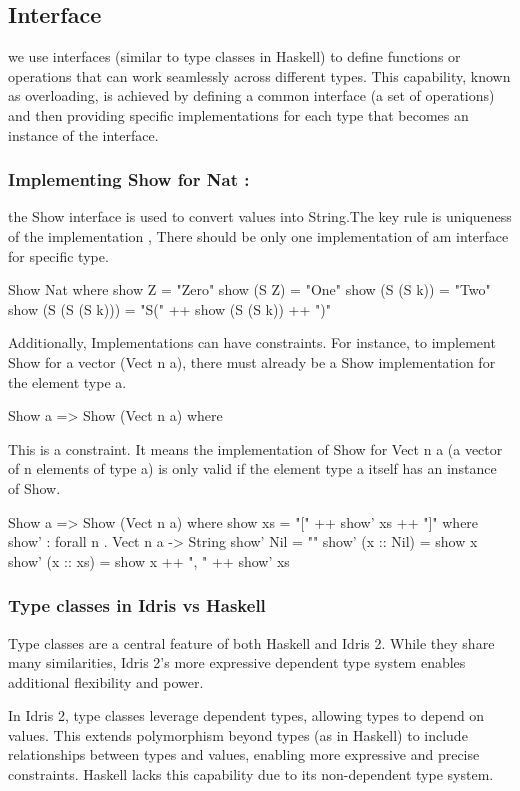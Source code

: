 \documentclass[]{rptuseminar}
\begin{document}
\subsection{Interface}
we use interfaces (similar to type classes in Haskell) to define functions or operations that can work seamlessly across different types. This capability, known as overloading, is achieved by defining a common interface (a set of operations) and then providing specific implementations for each type that becomes an instance of the interface.

\subsubsection{Implementing Show for Nat :}
the Show interface is used to convert values into String.The key rule is uniqueness of the implementation , There should be only one implementation of am interface for specific type.
\begin{idris}
    Show Nat where
    show Z     = "Zero"
    show (S Z) = "One"
    show (S (S k)) = "Two"
    show (S (S (S k))) = "S(" ++ show (S (S k)) ++ ")"
  
\end{idris}
Additionally, Implementations can have constraints. For instance, to implement Show for a vector (Vect n a), there must already be a Show implementation for the element type a.
\begin{idris}
    Show a => Show (Vect n a) where
\end{idris}
This is a constraint. It means the implementation of Show for Vect n a (a vector of n elements of type a) is only valid if the element type a itself has an instance of Show. 
\begin{idris}
    Show a => Show (Vect n a) where
    show xs = "[" ++ show' xs ++ "]" where
        show' : forall n . Vect n a -> String
        show' Nil        = ""
        show' (x :: Nil) = show x
        show' (x :: xs)  = show x ++ ", " ++ show' xs
\end{idris}
\subsubsection{Type classes in Idris vs Haskell} 
Type classes are a central feature of both Haskell and Idris 2. While they share many similarities, Idris 2's more expressive dependent type system enables additional flexibility and power.

In Idris 2, type classes leverage dependent types, allowing types to depend on values. This extends polymorphism beyond types (as in Haskell) to include relationships between types and values, enabling more expressive and precise constraints. Haskell lacks this capability due to its non-dependent type system.
\end{document}
